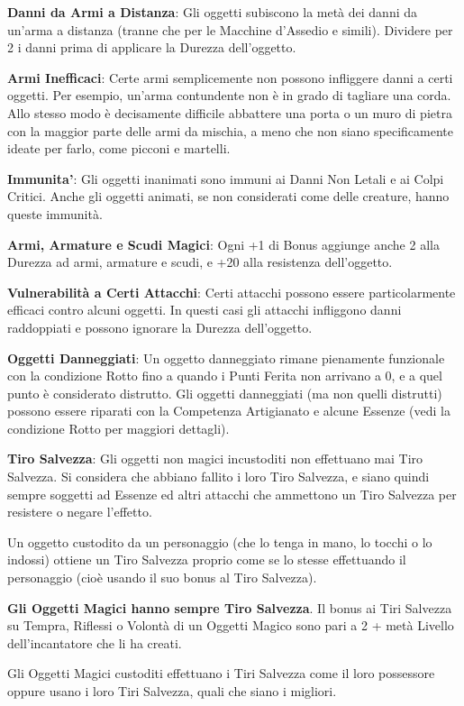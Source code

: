 \documentclass[a4paper,11pt,twoside,openany]{book}
\begin{document}
\textbf{Danni da Armi a Distanza}: Gli oggetti subiscono la metà dei danni da un'arma a distanza (tranne che per le Macchine d'Assedio e simili). Dividere per 2 i danni prima di applicare la Durezza dell'oggetto.

\textbf{Armi Inefficaci}: Certe armi semplicemente non possono infliggere danni a certi oggetti. Per esempio, un'arma contundente non è in grado di tagliare una corda.
Allo stesso modo è decisamente difficile abbattere una porta o un muro di pietra con la maggior parte delle armi da mischia, a meno che non siano specificamente ideate per farlo, come picconi e martelli.

\textbf{Immunita'}: Gli oggetti inanimati sono immuni ai Danni Non Letali e ai Colpi Critici. Anche gli oggetti animati, se non considerati come delle creature, hanno queste immunità.

\textbf{Armi, Armature e Scudi Magici}: Ogni +1 di Bonus aggiunge anche 2 alla Durezza ad armi, armature e scudi, e +20 alla resistenza dell'oggetto.

\textbf{Vulnerabilità a Certi Attacchi}: Certi attacchi possono essere particolarmente efficaci contro alcuni oggetti. In questi casi gli attacchi infliggono danni raddoppiati e possono ignorare la Durezza dell'oggetto.

\textbf{Oggetti Danneggiati}: Un oggetto danneggiato rimane pienamente funzionale con la condizione Rotto fino a quando i Punti Ferita non arrivano a 0, e a quel punto è considerato distrutto. Gli oggetti danneggiati (ma non quelli distrutti) possono essere riparati con la Competenza Artigianato e alcune Essenze (vedi la condizione Rotto per maggiori dettagli).

\textbf{Tiro Salvezza}: Gli oggetti non magici incustoditi non effettuano mai Tiro Salvezza. Si considera che abbiano fallito i loro Tiro Salvezza, e siano quindi sempre soggetti ad Essenze ed altri attacchi che ammettono un Tiro Salvezza per resistere o negare l'effetto.

Un oggetto custodito da un personaggio (che lo tenga in mano, lo tocchi o lo indossi) ottiene un Tiro Salvezza proprio come se lo stesse effettuando il personaggio (cioè usando il suo bonus al Tiro Salvezza).

\textbf{Gli Oggetti Magici hanno sempre Tiro Salvezza}. Il bonus ai Tiri Salvezza su Tempra, Riflessi o Volontà di un Oggetti Magico sono pari a 2 + metà Livello dell'incantatore che li ha creati.

Gli Oggetti Magici custoditi effettuano i Tiri Salvezza come il loro possessore oppure usano i loro Tiri Salvezza, quali che siano i migliori.
\end{document}

